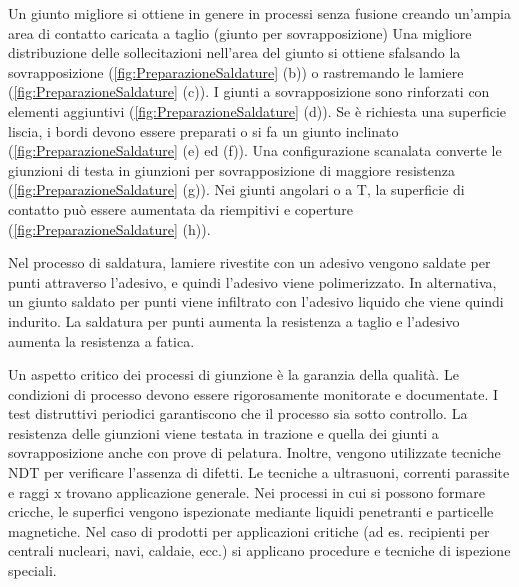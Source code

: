 Un giunto migliore si ottiene in genere in processi senza fusione creando un'ampia area di contatto caricata a taglio (giunto per sovrapposizione)
Una migliore distribuzione delle sollecitazioni nell'area del giunto si ottiene sfalsando la sovrapposizione (\ref{fig:PreparazioneSaldature} (b)) o rastremando le lamiere (\ref{fig:PreparazioneSaldature} (c)).
I giunti a sovrapposizione sono rinforzati con elementi aggiuntivi (\ref{fig:PreparazioneSaldature} (d)).
Se è richiesta una superficie liscia, i bordi devono essere preparati o si fa un giunto inclinato (\ref{fig:PreparazioneSaldature} (e) ed (f)).
Una configurazione scanalata converte le giunzioni di testa in giunzioni per sovrapposizione di maggiore resistenza (\ref{fig:PreparazioneSaldature} (g)).
Nei giunti angolari o a T, la superficie di contatto può essere aumentata da riempitivi e coperture (\ref{fig:PreparazioneSaldature} (h)).

Nel processo di saldatura, lamiere rivestite con un adesivo vengono saldate per punti attraverso l'adesivo, e quindi l'adesivo viene polimerizzato.
In alternativa, un giunto saldato per punti viene infiltrato con l'adesivo liquido che viene quindi indurito.
La saldatura per punti aumenta la resistenza a taglio e l'adesivo aumenta la resistenza a fatica.

Un aspetto critico dei processi di giunzione è la garanzia della qualità. Le condizioni di processo devono essere rigorosamente monitorate e documentate. I test distruttivi periodici garantiscono che il processo sia sotto controllo. La resistenza delle giunzioni viene testata in trazione e quella dei giunti a sovrapposizione anche con prove di pelatura.
Inoltre, vengono utilizzate tecniche \ac{NDT} per verificare l'assenza di difetti. Le tecniche a ultrasuoni, correnti parassite e raggi x trovano applicazione generale.
Nei processi in cui si possono formare cricche, le superfici vengono ispezionate mediante liquidi penetranti e particelle magnetiche.
Nel caso di prodotti per applicazioni critiche (ad es. recipienti per centrali nucleari, navi, caldaie, ecc.) si applicano procedure e tecniche di ispezione speciali.